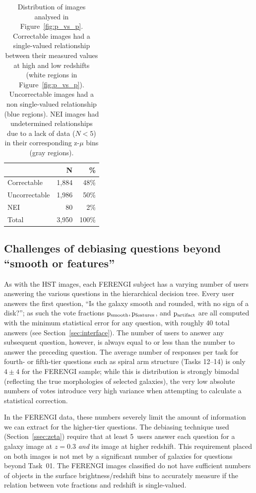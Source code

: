\documentclass[twocolumn]{aastex6}
\begin{document}
\begin{table}
\caption{Distribution of \ferengi{} images analysed in Figure~\ref{fig:p_vs_p}. Correctable images had a single-valued relationship between their measured \pfeatures{} values at high and low redshifts (white regions in Figure~\ref{fig:p_vs_p}). Uncorrectable images had a non single-valued relationship (blue regions). NEI images had undetermined relationships due to a lack of data ($N<5$) in their corresponding z-$\mu$ bins (gray regions).\label{tbl:ferengi_corrections}}
\begin{tabular}{lrr}
\hline \hline
				                   & N       & \% \\
\hline 
Correctable                        & 1,884   & 48\% \\
Uncorrectable                      & 1,986   & 50\% \\
NEI                                & 80     &  2\%\\
Total                              & 3,950   & 100\% \\
\hline \hline
\end{tabular}
\end{table}

\subsection{Challenges of debiasing questions beyond ``smooth or features''}

As with the HST images, each FERENGI subject has a varying number of users answering the various questions in the hierarchical decision tree. Every user answers the first question, ``Is the galaxy smooth and rounded, with no sign of a disk?''; as such the vote fractions $\rm p_{smooth}, p_{features}$, and $\rm p_{artifact}$ are all computed with the minimum statistical error for any question, with roughly 40 total answers (see Section~\ref{sec:interface}). The number of users to answer any subsequent question, however, is always equal to or less than the number to answer the preceding question. The average number of responses per task for fourth- or fifth-tier questions such as spiral arm structure (Tasks 12--14) is only $4\pm4$ for the FERENGI sample; while this is distribution is strongly bimodal (reflecting the true morphologies of selected galaxies), the very low absolute numbers of votes introduce very high variance when attempting to calculate a statistical correction.

In the FERENGI data, these numbers severely limit the amount of information we can extract for the higher-tier questions. The debiasing technique used (Section~\ref{ssec:zeta}) require that at least 5~users answer each question for a galaxy image at $z=0.3$ \emph{and} its image at higher redshift. This requirement placed on both images is not met by a significant number of galaxies for questions beyond Task~01. The FERENGI images classified do not have sufficient numbers of objects in the surface brightness/redshift bins to accurately measure if the relation between vote fractions and redshift is single-valued.  
\end{document}
